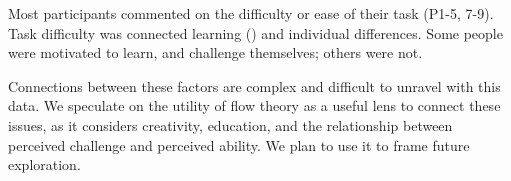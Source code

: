     
    Most participants commented on the difficulty or ease of their task (P1-5, 7-9). Task difficulty was connected learning () and individual differences.
    Some people were motivated to learn, and challenge themselves; others were not.    
    
    Connections between these factors are complex and difficult to unravel with this data.
    We speculate on the utility of flow theory
    \cite{Csikszentmihalyi1996} as a useful lens to connect these issues, as it considers creativity, education, and the relationship between perceived challenge and perceived ability.
    We plan to use it to frame future exploration.
    
    
    
    
    
    
            
                
